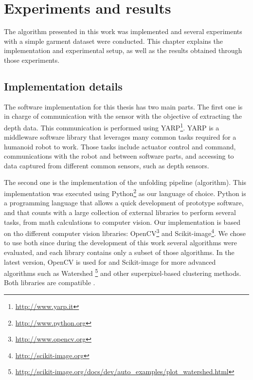 \chapter{Experiments and results}
\label{experiments_and_results}

The algorithm presented in this work was implemented and several experiments with a simple garment dataset were conducted. This chapter explains the implementation and experimental setup, as well as the results obtained through those experiments.


\section{Implementation details}
\label{experiments:implementation}
The software implementation for this thesis has two main parts. The first one is in charge of communication with the sensor with the objective of extracting the depth data. This communication is performed using YARP\footnote{\url{http://www.yarp.it}}. YARP is a middleware software library  that leverages many common tasks required for a humanoid robot to work. Those tasks include actuator control and command, communications with the robot and between software parts, and accessing to data captured from different common sensors, such as depth sensors.

The second one is the implementation of the unfolding pipeline (algorithm). This implementation was executed using Python\footnote{\url{http://www.python.org}} as our language of choice. Python is a programming language that allows a quick development of prototype software, and that counts with a large collection of external libraries  to perform several tasks, from math calculations to computer vision. Our implementation is based on tho different computer vision libraries: OpenCV\footnote{\url{http://www.opencv.org}} and Scikit-image\footnote{\url{http://scikit-image.org}}. We chose to use both since during the development of this work several algorithms were evaluated, and each library contains only a subset of those algorithms. In the latest version, OpenCV is used for  and Scikit-image for more advanced algorithms such as Watershed \footnote{\url{http://scikit-image.org/docs/dev/auto_examples/plot_watershed.html}} and other superpixel-based clustering methods. Both libraries are compatible .

